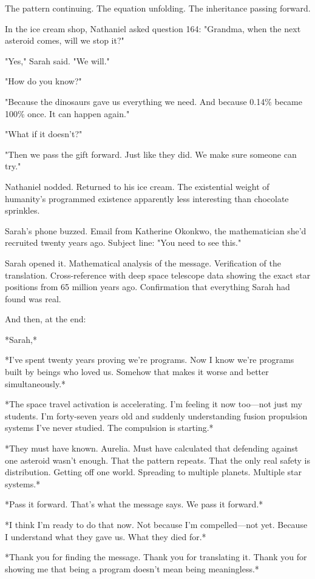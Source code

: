 The pattern continuing. The equation unfolding. The inheritance passing forward.

In the ice cream shop, Nathaniel asked question 164: "Grandma, when the next asteroid comes, will we stop it?"

"Yes," Sarah said. "We will."

"How do you know?"

"Because the dinosaurs gave us everything we need. And because 0.14\% became 100\% once. It can happen again."

"What if it doesn't?"

"Then we pass the gift forward. Just like they did. We make sure someone can try."

Nathaniel nodded. Returned to his ice cream. The existential weight of humanity's programmed existence apparently less interesting than chocolate sprinkles.

Sarah's phone buzzed. Email from Katherine Okonkwo, the mathematician she'd recruited twenty years ago. Subject line: "You need to see this."

Sarah opened it. Mathematical analysis of the message. Verification of the translation. Cross-reference with deep space telescope data showing the exact star positions from 65 million years ago. Confirmation that everything Sarah had found was real.

And then, at the end:

*Sarah,*

*I've spent twenty years proving we're programs. Now I know we're programs built by beings who loved us. Somehow that makes it worse and better simultaneously.*

*The space travel activation is accelerating. I'm feeling it now too—not just my students. I'm forty-seven years old and suddenly understanding fusion propulsion systems I've never studied. The compulsion is starting.*

*They must have known. Aurelia. Must have calculated that defending against one asteroid wasn't enough. That the pattern repeats. That the only real safety is distribution. Getting off one world. Spreading to multiple planets. Multiple star systems.*

*Pass it forward. That's what the message says. We pass it forward.*

*I think I'm ready to do that now. Not because I'm compelled—not yet. Because I understand what they gave us. What they died for.*

*Thank you for finding the message. Thank you for translating it. Thank you for showing me that being a program doesn't mean being meaningless.*


